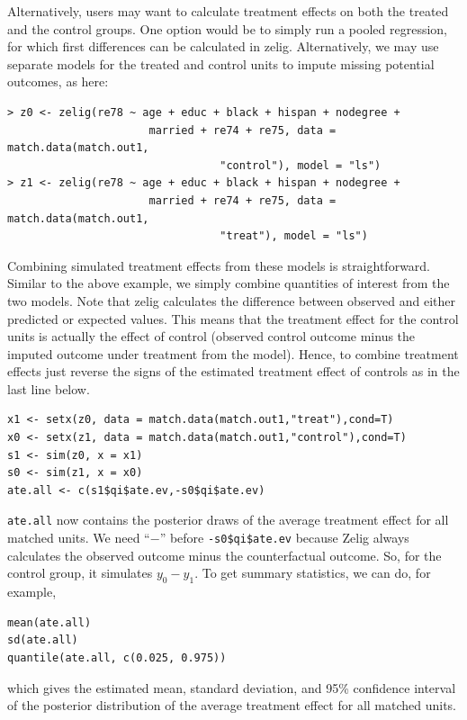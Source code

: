 \documentclass[oneside,letterpaper,titlepage]{article}
\begin{document}
Alternatively, users may want to calculate treatment effects on both
the treated and the control groups.  One option would be to simply
run a pooled regression, for which first differences can be calculated
in zelig.  Alternatively, we may use separate models for the treated
and control units to impute missing potential outcomes, as here:
\begin{verbatim}
> z0 <- zelig(re78 ~ age + educ + black + hispan + nodegree +
                      married + re74 + re75, data = match.data(match.out1,
                                 "control"), model = "ls")
> z1 <- zelig(re78 ~ age + educ + black + hispan + nodegree +
                      married + re74 + re75, data = match.data(match.out1,
                                 "treat"), model = "ls")
\end{verbatim}
Combining simulated treatment effects from these models is
straightforward.  Similar to the above example, we simply combine
quantities of interest from the two models.  Note that zelig
calculates the difference between observed and either predicted or
expected values.  This means that the treatment effect for the control
units is actually the effect of control (observed control outcome
minus the imputed outcome under treatment from the model).  Hence, to
combine treatment effects just reverse the signs of the estimated
treatment effect of controls as in the last line below.
\begin{verbatim}
x1 <- setx(z0, data = match.data(match.out1,"treat"),cond=T)
x0 <- setx(z1, data = match.data(match.out1,"control"),cond=T)
s1 <- sim(z0, x = x1)
s0 <- sim(z1, x = x0)
ate.all <- c(s1$qi$ate.ev,-s0$qi$ate.ev)
\end{verbatim}
{\tt ate.all} now contains the posterior draws of the average
treatment effect for all matched units. We need ``$-$'' before
\texttt{-s0\$qi\$ate.ev} because Zelig always calculates the observed
outcome minus the counterfactual outcome. So, for the control group,
it simulates $y_0-y_1$. To get summary statistics, we can do, for
example, 
\begin{verbatim}
mean(ate.all)
sd(ate.all)
quantile(ate.all, c(0.025, 0.975))
\end{verbatim}
which gives the estimated mean, standard deviation, and 95\%
confidence interval of the posterior distribution of the average
treatment effect for all matched units.
\end{document}
